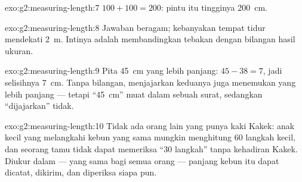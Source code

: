 \begin{solution}{exo:g2:measuring-length:7}
$100 + 100 = 200$: pintu itu tingginya \qty{200}{cm}.
\end{solution}

\begin{solution}{exo:g2:measuring-length:8}
Jawaban beragam; kebanyakan tempat tidur mendekati \qty{2}{m}.
Intinya adalah membandingkan tebakan dengan bilangan hasil ukuran.
\end{solution}

\begin{solution}{exo:g2:measuring-length:9}
Pita \qty{45}{cm} yang lebih panjang: $45 - 38 = 7$, jadi selisihnya
\qty{7}{cm}. Tanpa bilangan, menjajarkan keduanya juga menemukan yang
lebih panjang --- tetapi ``\qty{45}{cm}'' muat dalam sebuah surat,
sedangkan ``dijajarkan'' tidak.
\end{solution}

\begin{solution}{exo:g2:measuring-length:10}
Tidak ada orang lain yang punya kaki Kakek: anak kecil yang melangkahi
kebun yang sama mungkin menghitung $60$ langkah kecil, dan seorang
tamu tidak dapat memeriksa ``$30$ langkah'' tanpa kehadiran Kakek.
Diukur dalam  --- yang sama bagi semua orang --- panjang kebun
itu dapat dicatat, dikirim, dan diperiksa siapa pun.
\end{solution}
